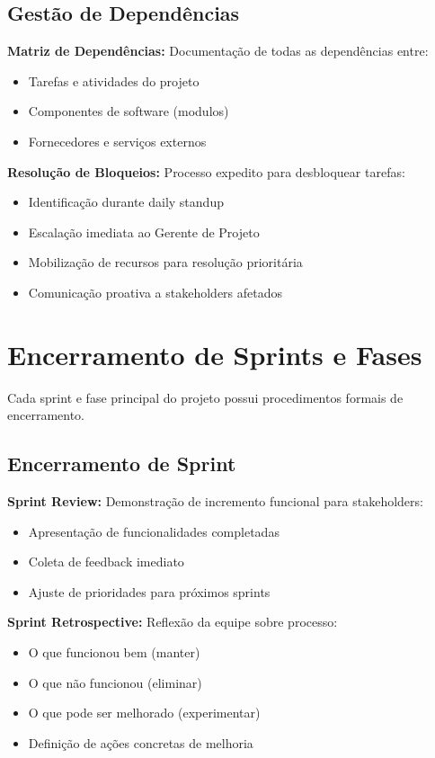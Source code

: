 \subsection{Gestão de Dependências}

\textbf{Matriz de Dependências:} Documentação de todas as dependências entre:
\begin{itemize}
    \item Tarefas e atividades do projeto
    \item Componentes de software (modulos)
    \item Fornecedores e serviços externos
\end{itemize}

\textbf{Resolução de Bloqueios:} Processo expedito para desbloquear tarefas:
\begin{itemize}
    \item Identificação durante daily standup
    \item Escalação imediata ao Gerente de Projeto
    \item Mobilização de recursos para resolução prioritária
    \item Comunicação proativa a stakeholders afetados
\end{itemize}

\section{Encerramento de Sprints e Fases}

Cada sprint e fase principal do projeto possui procedimentos formais de encerramento.

\subsection{Encerramento de Sprint}

\textbf{Sprint Review:} Demonstração de incremento funcional para stakeholders:
\begin{itemize}
    \item Apresentação de funcionalidades completadas
    \item Coleta de feedback imediato
    \item Ajuste de prioridades para próximos sprints
\end{itemize}

\textbf{Sprint Retrospective:} Reflexão da equipe sobre processo:
\begin{itemize}
    \item O que funcionou bem (manter)
    \item O que não funcionou (eliminar)
    \item O que pode ser melhorado (experimentar)
    \item Definição de ações concretas de melhoria
\end{itemize}

